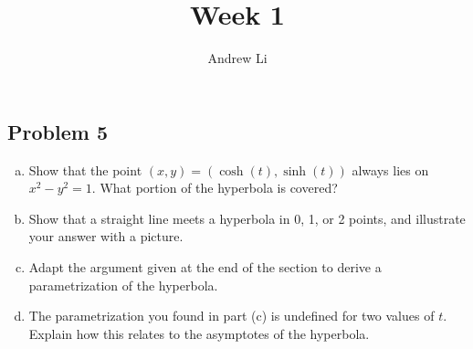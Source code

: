 \documentclass{homework}
\title{Week 1}
\author{Andrew Li}
\begin{document}
    \maketitle

    \setcounter{section}{1}
    \setcounter{subsection}{2}
    \subsection{Problem 5}
    
    \begin{enumerate}[(a)]
        \item Show that the point $(x, y) = (\cosh(t), \sinh(t))$ always lies on $x^2 - y^2 = 1$. What portion of the hyperbola is covered?
        \item Show that a straight line meets a hyperbola in 0, 1, or 2 points, and illustrate your answer with a picture.
        \item Adapt the argument given at the end of the section to derive a parametrization of the hyperbola.
        \item The parametrization you found in part (c) is undefined for two values of $t$. Explain how this relates to the asymptotes of the hyperbola.
    \end{enumerate}
    
\end{document}

